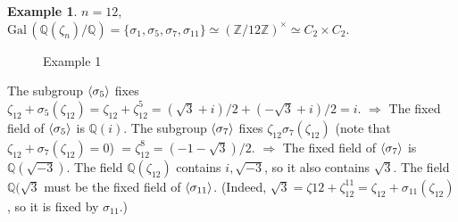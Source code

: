 \documentclass{article}
\theoremstyle{definition}
\newtheorem{ex}{Example}
\newcommand{\QQ}{\mathbb Q}
\newcommand{\ZZ}{\mathbb Z}
\newcommand{\Ra}{\Rightarrow}
\newcommand{\Gal}{\text{Gal}\,}
\begin{document}
\begin{ex}
	$n = 12$, $\Gal (\QQ(\zeta_n)/\QQ) = \{\sigma_1, \sigma_5, \sigma_7, \sigma_{11}\} \simeq (\ZZ/12 \ZZ)^\times \simeq C_2 \times C_2$.

	\begin{figure}[H]
		\centering
		\caption{Example 1}
	\end{figure}
	
	The subgroup $\ev{\sigma_5}$ fixes $\zeta_{12} + \sigma_5(\zeta_{12}) = \zeta_{12} + \zeta_{12}^5 = (\sqrt{3} + i)/2 + (-\sqrt{3} + i)/2 = i$.
	$\Ra$ The fixed field of $\ev{\sigma_5}$ is $\QQ(i)$.
	The subgroup $\ev{\sigma_7}$ fixes $\zeta_{12} \sigma_7 (\zeta_{12})$ (note that $\zeta_{12} + \sigma_7 (\zeta_{12}) = 0$) $= \zeta_{12}^8 = (-1 - \sqrt{3})/2$.
	$\Ra$ The fixed field of $\ev{\sigma_7}$ is $\QQ(\sqrt{-3})$.
	The field $\QQ(\zeta_{12})$ contains $i, \sqrt{-3}$, so it also contains $\sqrt{3}$.
	The field $\QQ(\sqrt{3}$ must be the fixed field of $\ev{\sigma_{11}}$. 
	(Indeed, $\sqrt{3} = \zeta{12} + \zeta_{12}^{11} = \zeta_{12} + \sigma_{11} (\zeta_{12})$, so it is fixed by $\sigma_{11}$.)
\end{ex}
\end{document}
